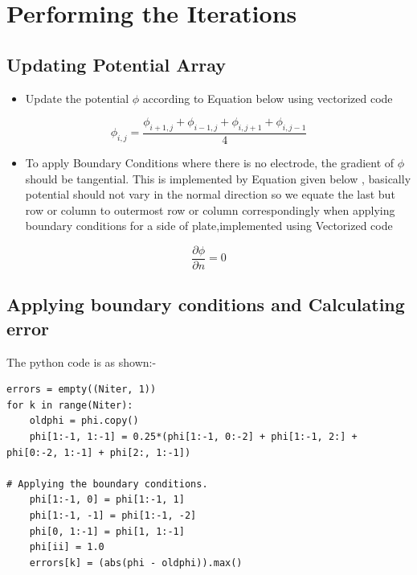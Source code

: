 \documentclass[11pt, a4paper]{article}
\begin{document}
 \section{Performing the Iterations}
 \subsection{Updating Potential Array}

   \begin{itemize}
   
   \item
    Update the potential \(\phi\) according to Equation below using
     vectorized code
   \end{itemize}
   
   \begin{equation}
           \phi_{i,j} = \frac{\phi_{i+1,j} + \phi_{i-1,j} + \phi_{i,j+1} + \phi_{i,j-1}}{4} 
   \end{equation}
   
   \begin{itemize}
   \item
     To apply Boundary Conditions where there is no electrode, the gradient
     of \(\phi\) should be tangential. This is implemented by Equation
     given below , basically potential should not vary in the normal
     direction so we equate the last but row or column to outermost row or
     column correspondingly when applying boundary conditions for a side of
     plate,implemented using Vectorized code
   \end{itemize}
   
   \begin{equation}
    \frac{\partial \phi}{\partial n} = 0
   \end{equation}
 \subsection{Applying boundary conditions and Calculating error}
   
   The python code is as shown:-

   \begin{verbatim}
errors = empty((Niter, 1))
for k in range(Niter):
	oldphi = phi.copy()
	phi[1:-1, 1:-1] = 0.25*(phi[1:-1, 0:-2] + phi[1:-1, 2:] + phi[0:-2, 1:-1] + phi[2:, 1:-1])

# Applying the boundary conditions.
	phi[1:-1, 0] = phi[1:-1, 1]
	phi[1:-1, -1] = phi[1:-1, -2]
	phi[0, 1:-1] = phi[1, 1:-1]
	phi[ii] = 1.0
	errors[k] = (abs(phi - oldphi)).max()
    
         \end{verbatim}
 
\end{document}
